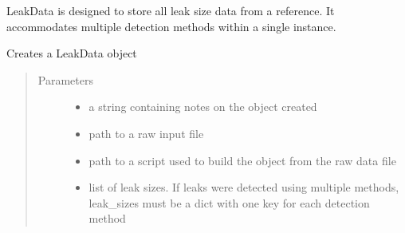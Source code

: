 \documentclass[letterpaper,10pt,english]{sphinxmanual}
\begin{document}
\begin{fulllineitems}
\label{\detokenize{index:feast.input_data_classes.LeakData}}
LeakData is designed to store all leak size data from a reference. It accommodates multiple detection methods
within a single instance.

Creates a LeakData object
\begin{quote}\begin{description}
\item[{Parameters}] \leavevmode\begin{itemize}
\item {} 
 \textendash{} a string containing notes on the object created

\item {} 
 \textendash{} path to a raw input file

\item {} 
 \textendash{} path to a script used to build the object from the raw data file

\item {} 
 \textendash{} list of leak sizes. If leaks were detected using multiple methods, leak\_sizes must be a dict
with one key for each detection method

\end{itemize}

\end{description}\end{quote}


\end{fulllineitems}
\end{document}
